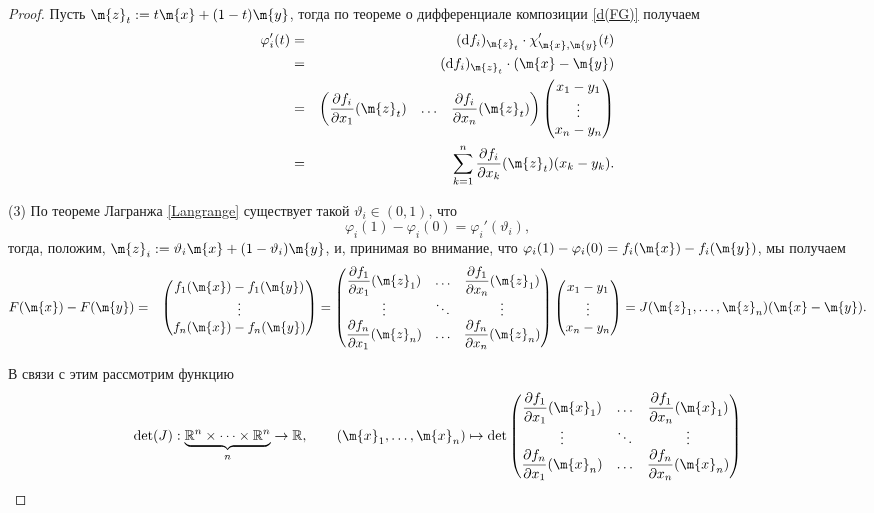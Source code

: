 \begin{proof}
Пусть $\m{z}_t:=t\m{x} + (1-t)\m{y}$, тогда по теореме о дифференциале композиции \ref{d(FG)} получаем
\begin{eqnarray*}
 \varphi'_i(t) &=& (\mathrm{d}f_i)_{\m{z}_t} \cdot \chi'_{\m{x},\m{y}}(t) \\
 &=& (\mathrm{d}f_i)_{\m{z}_t} \cdot (\m{x} - \m{y}) \\
 &=& \begin{pmatrix}
     \dfrac{\partial f_i}{\partial x_1}({\m{z}_t}) & \ldots & \dfrac{\partial f_i}{\partial x_n} ({\m{z}_t})
 \end{pmatrix} \begin{pmatrix}
     x_1 - y_1 \\
     \vdots \\
     x_n -y_n
 \end{pmatrix} \\
 &=& \sum_{k=1}^n \dfrac{\partial f_i}{\partial x_k}({\m{z}_t}) (x_k - y_k) .
\end{eqnarray*}

(3) По теореме Лагранжа \ref{Langrange} существует такой $\vartheta_i \in (0,1)$, что 
\[
 \varphi_i(1) - \varphi_i(0) = \varphi_i'(\vartheta_i),
\]
тогда, положим, $\m{z}_i: = \vartheta_i \m{x} + (1-\vartheta_i)\m{y}$, и, принимая во внимание, что $\varphi_i(1) - \varphi_i(0) = f_i(\m{x}) - f_i(\m{y})$, мы получаем
\begin{eqnarray*}
 F(\m{x}) - F(\m{y}) &=& \begin{pmatrix}
   f_1(\m{x}) - f_1(\m{y})\\
   \vdots \\
    f_n(\m{x}) - f_n(\m{y})
 \end{pmatrix} = \begin{pmatrix}
     \dfrac{\partial f_1}{\partial x_1}(\m{z}_1) & \ldots & \dfrac{\partial f_1}{\partial x_n}(\m{z}_1) \\
     \vdots & \ddots & \vdots \\
     \dfrac{\partial f_n}{\partial x_1}(\m{z}_n) & \ldots & \dfrac{\partial f_n}{\partial x_n}(\m{z}_n)
 \end{pmatrix}\begin{pmatrix}
   x_1-y_1\\
   \vdots \\
    x_n - y_n
 \end{pmatrix} = J(\m{z}_1,\ldots, \m{z}_n)(\m{x} - \m{y}).
\end{eqnarray*}

В связи с этим рассмотрим функцию 
\[
 \mathrm{det}(J): \underbrace{\mathbb{R}^n \times \cdots \times \mathbb{R}^n}_n \to \mathbb{R}, \qquad (\m{x}_1,\ldots, \m{x}_n) \mapsto \mathrm{det} \begin{pmatrix}
     \dfrac{\partial f_1}{\partial x_1}(\m{x}_1) & \ldots & \dfrac{\partial f_1}{\partial x_n}(\m{x}_1) \\
     \vdots & \ddots & \vdots \\
     \dfrac{\partial f_n}{\partial x_1}(\m{x}_n) & \ldots & \dfrac{\partial f_n}{\partial x_n}(\m{x}_n)
 \end{pmatrix}
\]


\end{proof}
